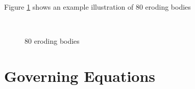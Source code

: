 \documentclass[3p]{elsarticle}
\newcommand{\vsp}[1]{\vspace{#1 pc} \noindent}
\begin{document}
\vsp{5}


Figure \ref{FigVortVel} shows an example illustration of 80 eroding bodies


\begin{figure}[] \centering
         \\
   \caption{80 eroding bodies}
   \label{FigVortVel}
\end{figure}

\section{Governing Equations}
\label{sec:formulation}
\end{document}

